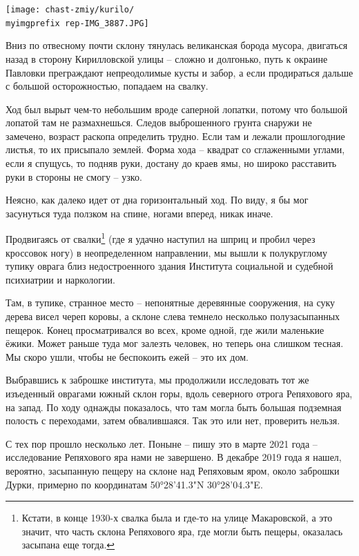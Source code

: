 \begin{center}
\texttt{[image: chast-zmiy/kurilo/\\myimgprefix rep-IMG\_3887.JPG]}
\end{center}

Вниз по отвесному почти склону тянулась великанская борода мусора, двигаться назад в сторону Кирилловской улицы – сложно и долгонько, путь к окраине Павловки преграждают непреодолимые кусты и забор, а если продираться дальше с большой осторожностью, попадаем на свалку.

Ход был вырыт чем-то небольшим вроде саперной лопатки, потому что большой лопатой там не размахнешься. Следов выброшенного грунта снаружи не замечено, возраст раскопа определить трудно. Если там и лежали прошлогодние листья, то их присыпало землей. Форма хода – квадрат со сглаженными углами, если я спущусь, то подняв руки, достану до краев ямы, но широко расставить руки в стороны не смогу – узко.

Неясно, как далеко идет от дна горизонтальный ход. По виду, я бы мог засунуться туда ползком на спине, ногами вперед, никак иначе.

Продвигаясь от свалки\footnote{Кстати, в конце 1930-х свалка была и где-то на улице Макаровской, а это значит, что часть склона Репяхового яра, где могли быть пещеры, оказалась засыпана еще тогда.} (где я удачно наступил на шприц и пробил через кроссовок ногу) в неопределенном направлении, мы вышли к полукруглому тупику оврага близ недостроенного здания Института социальной и судебной психиатрии и наркологии.

Там, в тупике, странное место – непонятные деревянные сооружения, на суку дерева висел череп коровы, а склоне слева темнело несколько полузасыпанных пещерок. Конец просматривался во всех, кроме одной, где жили маленькие ёжики. Может раньше туда мог залезть человек, но теперь она слишком тесная. Мы скоро ушли, чтобы не беспокоить ежей – это их дом.

Выбравшись к заброшке института, мы продолжили исследовать тот же изъеденный оврагами южный склон горы, вдоль северного отрога Репяхового яра, на запад. По ходу однажды показалось, что там могла быть большая подземная полость с переходами, затем обвалившаяся. Так это или нет, проверить нельзя.

С тех пор прошло несколько лет. Поныне – пишу это в марте 2021 года – исследование Репяхового яра нами не завершено. В декабре 2019 года я нашел, вероятно, засыпанную пещеру на склоне над Репяховым яром, около заброшки Дурки, примерно по координатам 50°28'41.3"N 30°28'04.3"E. 

